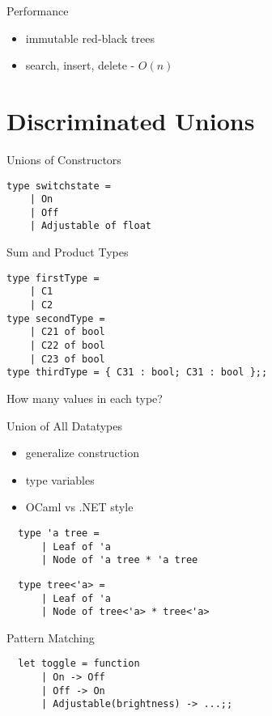 \documentclass{beamer}
\begin{document}
\begin{frame}{Performance}
  \begin{itemize}[<+->]
    \item immutable red-black trees
    \item search, insert, delete - $O(n)$
  \end{itemize}
\end{frame}

\section{Discriminated Unions}
\frame{\tableofcontents[currentsection]}


\begin{frame}[fragile]{Unions of Constructors}
  \begin{verbatim}
type switchstate =
    | On
    | Off
    | Adjustable of float
  \end{verbatim}
\end{frame}

\begin{frame}[fragile]{Sum and Product Types}
  \begin{verbatim}
type firstType = 
    | C1
    | C2
type secondType =
    | C21 of bool
    | C22 of bool
    | C23 of bool
type thirdType = { C31 : bool; C31 : bool };;
  \end{verbatim}
  How many values in each type?
\end{frame}

\begin{frame}[fragile]{Union of All Datatypes}
  \begin{itemize}[<+->]
    \item generalize construction
    \item type variables
    \item OCaml vs .NET style
  \end{itemize}
  \pause
  \begin{verbatim}
  type 'a tree =
      | Leaf of 'a
      | Node of 'a tree * 'a tree
  \end{verbatim}
  \begin{verbatim}
  type tree<'a> =
      | Leaf of 'a
      | Node of tree<'a> * tree<'a>
  \end{verbatim}
\end{frame}

\begin{frame}[fragile]{Pattern Matching}
  \begin{verbatim}
  let toggle = function
      | On -> Off
      | Off -> On
      | Adjustable(brightness) -> ...;;
  \end{verbatim}
\end{frame}
\end{document}
